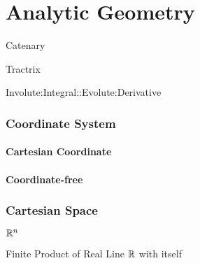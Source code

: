 \part{Analytic Geometry}\label{sec:analytic_geometry}

Catenary

Tractrix

Involute:Integral::Evolute:Derivative



\section{Coordinate System}\label{sec:coordinate_system}

\subsection{Cartesian Coordinate}\label{sec:cartesian_coordinate}

\subsection{Coordinate-free}\label{sec:coordinate_free}



\section{Cartesian Space}\label{sec:cartesian_space}

$\mathbb{R}^n$

Finite Product of Real Line $\mathbb{R}$ with itself



